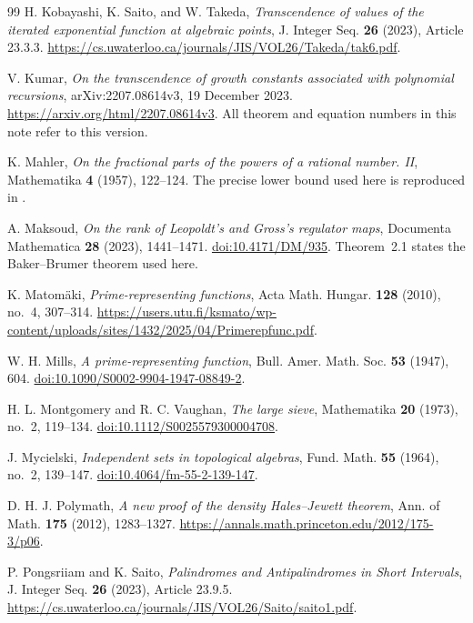 \documentclass[11pt,a4paper]{article}
\theoremstyle{definition}
\theoremstyle{remark}
\numberwithin{equation}{section}
\begin{document}
\begin{thebibliography}{99}
H. Kobayashi, K. Saito, and W. Takeda,
\emph{Transcendence of values of the iterated exponential function at algebraic points},
J. Integer Seq. \textbf{26} (2023), Article 23.3.3.
\url{https://cs.uwaterloo.ca/journals/JIS/VOL26/Takeda/tak6.pdf}.

V. Kumar, \emph{On the transcendence of growth constants associated with
polynomial recursions}, arXiv:2207.08614v3, 19 December 2023.
\url{https://arxiv.org/html/2207.08614v3}.
All theorem and equation numbers in this note refer to this version.

K. Mahler, \emph{On the fractional parts of the powers of a rational number. II},
Mathematika \textbf{4} (1957), 122--124.
The precise lower bound used here is reproduced in \cite[Theorem~2.5]{SaitoMills}.

A. Maksoud, \emph{On the rank of Leopoldt's and Gross's regulator maps},
Documenta Mathematica \textbf{28} (2023), 1441--1471.
\href{https://doi.org/10.4171/DM/935}{doi:10.4171/DM/935}.
Theorem~2.1 states the Baker--Brumer theorem used here.

K. Matom\"aki, \emph{Prime-representing functions},
Acta Math. Hungar. \textbf{128} (2010), no.~4, 307--314.
\url{https://users.utu.fi/ksmato/wp-content/uploads/sites/1432/2025/04/Primerepfunc.pdf}.

W. H. Mills, \emph{A prime-representing function},
Bull. Amer. Math. Soc. \textbf{53} (1947), 604.
\href{https://doi.org/10.1090/S0002-9904-1947-08849-2}{doi:10.1090/S0002-9904-1947-08849-2}.

H. L. Montgomery and R. C. Vaughan, \emph{The large sieve},
Mathematika \textbf{20} (1973), no.~2, 119--134.
\href{https://doi.org/10.1112/S0025579300004708}{doi:10.1112/S0025579300004708}.

J. Mycielski,
\emph{Independent sets in topological algebras},
Fund. Math. \textbf{55} (1964), no.~2, 139--147.
\href{https://doi.org/10.4064/fm-55-2-139-147}{doi:10.4064/fm-55-2-139-147}.

D. H. J. Polymath, \emph{A new proof of the density Hales--Jewett theorem},
Ann. of Math. \textbf{175} (2012), 1283--1327.
\url{https://annals.math.princeton.edu/2012/175-3/p06}.

P. Pongsriiam and K. Saito, \emph{Palindromes and Antipalindromes in Short Intervals},
J. Integer Seq. \textbf{26} (2023), Article 23.9.5.
\url{https://cs.uwaterloo.ca/journals/JIS/VOL26/Saito/saito1.pdf}.


\end{thebibliography}
\end{document}
